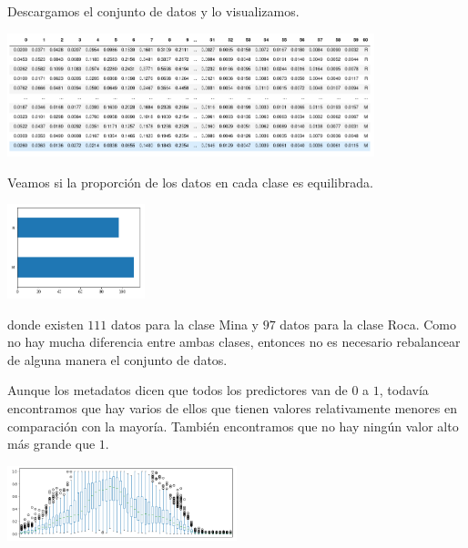 \documentclass[letterpaper,11pt]{article}
\begin{document}
\begin{enumerate}
    Descargamos el conjunto de datos y lo visualizamos.
    \begin{center}
        \includegraphics[width=0.8\textwidth]{imagenes/sonar-dataset.png}
    \end{center}

    Veamos si la proporción de los datos en cada clase es equilibrada.
    \begin{center}
        \includegraphics[width=0.3\textwidth]{imagenes/sonar-equilibrio.png}
    \end{center}

    donde existen $111$ datos para la clase Mina y $97$ datos para la clase 
    Roca. Como no hay mucha diferencia entre ambas clases, entonces no es 
    necesario rebalancear de alguna manera el conjunto de datos. 

    Aunque los metadatos dicen que todos los predictores van de $0$ a $1$, 
    todavía encontramos que hay varios de ellos que tienen valores relativamente
    menores en comparación con la mayoría. También encontramos que no hay
    ningún valor alto más grande que $1$.
    \begin{center}
        \includegraphics[width=0.5\textwidth]{imagenes/sonar-boxes.png}
    \end{center}


\end{enumerate}
\end{document}
